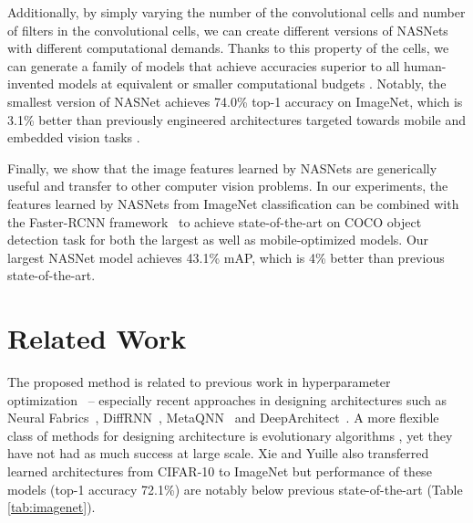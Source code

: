 \documentclass[10pt,twocolumn,letterpaper]{article}
\begin{document}
  Additionally, by simply varying the number of the convolutional cells and number of filters in the convolutional cells, we can create different versions of NASNets with different computational demands. Thanks to this property of the cells, we can generate a family of models that achieve accuracies superior to all human-invented models at equivalent or smaller computational budgets \cite{szegedy2016rethinking,BatchNorm}. Notably, the smallest version of NASNet achieves 74.0\% top-1 accuracy on ImageNet, which is 3.1\% better than previously engineered architectures targeted towards mobile and embedded vision tasks \cite{howard2017mobilenets,shufflenet}.

Finally, we show that the image features learned by NASNets are generically useful and transfer to other computer vision problems. In our experiments, the features learned by NASNets from ImageNet classification can be combined with the Faster-RCNN framework~\cite{faster_rcnn} to achieve state-of-the-art on COCO object detection task for both the largest as well as mobile-optimized models. Our largest NASNet model achieves 43.1\% mAP, which is 4\% better than previous state-of-the-art. %
\section{Related Work}

The proposed method is related to previous work in hyperparameter optimization~\cite{pinto2009high,bergstra2011algorithms,bergstra2012random,snoek2012practical,snoek2015scalable,bergstra2013making,mendoza2016towards} -- especially recent approaches in designing architectures such as Neural Fabrics~\cite{saxena2016convolutional}, DiffRNN~\cite{miconi2016}, MetaQNN~\cite{baker2016designing} and DeepArchitect~\cite{negrinho2017}.  A more flexible class of methods for designing architecture  is evolutionary algorithms \cite{wierstra2005modeling,floreano2008neuroevolution,stanley2009hypercube,jozefowicz2015empirical,real2017large,miikkulainen2017evolving,xie17}, yet they have not had as much success at large scale. 
Xie and Yuille \cite{xie17} also transferred learned architectures from CIFAR-10 to ImageNet but performance of these models (top-1 accuracy 72.1\%) are notably below previous state-of-the-art (Table \ref{tab:imagenet}).
\end{document}

